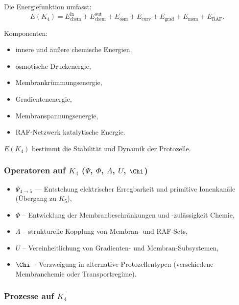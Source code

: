 Die Energiefunktion umfasst:
\[
E(K_4) =
E_{\mathrm{chem}}^{\mathrm{in}} + E_{\mathrm{chem}}^{\mathrm{out}}
+ E_{\mathrm{osm}} + E_{\mathrm{curv}}
+ E_{\mathrm{grad}} + E_{\mathrm{mem}}
+ E_{\mathrm{RAF}}.
\]

Komponenten:
\begin{itemize}
    \item innere und äußere chemische Energien,
    \item osmotische Druckenergie,
    \item Membrankrümmungsenergie,
    \item Gradientenenergie,
    \item Membranspannungsenergie,
    \item RAF-Netzwerk katalytische Energie.
\end{itemize}

$E(K_4)$ bestimmt die Stabilität und Dynamik der Protozelle.

\subsubsection{Operatoren auf \texorpdfstring{$K_4$}{K_4} (\texorpdfstring{$\Psi$}{\Psi}, \texorpdfstring{$\Phi$}{\Phi}, \texorpdfstring{$\Lambda$}{\Lambda}, \texorpdfstring{$U$}{U}, \texorpdfstring{$\Chi$}{\Chi})}

\begin{itemize}
    \item $\Psi_{4\to5}$ — Entstehung elektrischer Erregbarkeit und
          primitive Ionenkanäle (Übergang zu $K_5$),
    \item $\Phi$ – Entwicklung der Membranbeschränkungen und -zulässigkeit
          Chemie,
    \item $\Lambda$ – strukturelle Kopplung von Membran- und RAF-Sets,
    \item $U$ – Vereinheitlichung von Gradienten- und Membran-Subsystemen,
    \item $\Chi$ – Verzweigung in alternative Protozellentypen (verschiedene
          Membranchemie oder Transportregime).
\end{itemize}

\subsubsection{Prozesse auf \texorpdfstring{$K_4$}{K_4}}

